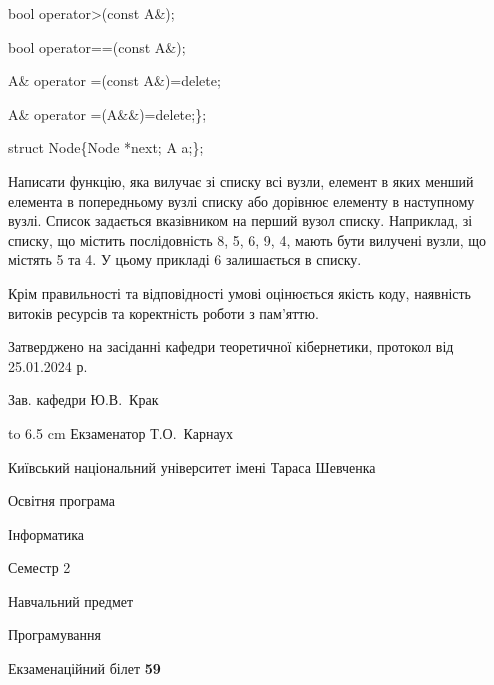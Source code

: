 \documentclass[12pt, ukrainian]{article}
\begin{document}
{\quad  bool operator>(const A\&); 

\quad  bool operator==(const A\&); 

\quad A\& operator =(const A\&)=delete; 

\quad  A\& operator =(A\&\&)=delete;\};

struct Node\{Node *next; A a;\};

 Написати функцію, яка вилучає зі списку всі вузли, елемент в яких менший елемента в попередньому вузлі списку або дорівнює елементу в наступному вузлі. Список задається вказівником на перший вузол списку. Наприклад, зі списку, що містить послідовність 8, 5, 6, 9, 4, мають бути вилучені вузли, що містять 5 та 4. У цьому прикладі 6 залишається в списку.

Крім правильності та відповідності умові оцінюється якість коду, наявність витоків ресурсів та коректність роботи з пам'яттю. 

}
{\smallskip\smallskip \begin {scriptsize} Затверджено на засіданні кафедри теоретичної кібернетики, протокол   від   25.01.2024 р.\par\smallskip\smallskip\smallskip\smallskip
{\parbox {6.5 cm} {Зав. кафедри \dotfill Ю.В.~Крак}}\hspace {0.7cm} {\hbox to 6.5 cm { Екзаменатор \dotfill Т.О.~Карнаух}} \end{scriptsize}}
\newpage
{{\begin {scriptsize}\par
{ \center  Київський національний університет імені Тараса Шевченка \par}
{\parbox {5 cm}{Освітня програма \hfill}{\parbox {7 cm}{Інформатика\hfill}}\parbox {6 cm}{\hfill Семестр 2}}\par
{\parbox {5 cm} {Навчальний предмет \hfill}\parbox {7 cm}{Програмування \hfill}\parbox {6cm}{\hfill}\par}\vspace{-15pt} \end{scriptsize}}{\center Екзаменаційний білет \No \textbf { 59 }\par}}
\end{document}
